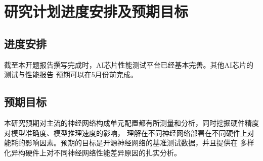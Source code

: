 \section{研究计划进度安排及预期目标}

\subsection{进度安排}
截至本开题报告撰写完成时，AI芯片性能测试平台已经基本完善。其他AI芯片的测试与性能报告
预期可以在5月份前完成。

\subsection{预期目标}
本研究预期对主流的神经网络构成单元配置都有所测量和分析，同时挖掘硬件精度对模型准确度、模型推理速度的影响，
理解在不同神经网络部署在不同硬件上对能耗的影响因素。预期的目标是开源神经网络的基准测试数据，并且提供在
多样化异构硬件上对不同神经网络性能差异原因的扎实分析。
